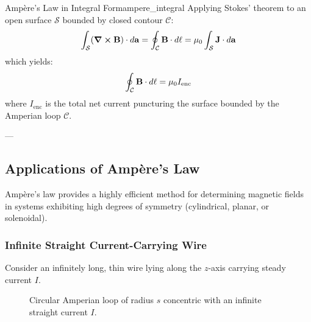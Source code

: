 \begin{proposition}{Ampère's Law in Integral Form}{ampere_integral}
Applying Stokes' theorem to an open surface $\mathcal{S}$ bounded by closed contour $\mathcal{C}$:
\begin{equation}
    \int_{\mathcal{S}} (\curl\vb{B}) \cdot d\vb{a} = \oint_{\mathcal{C}} \vb{B} \cdot d\vb{\ell} = \mu_0 \int_{\mathcal{S}} \vb{J} \cdot d\vb{a}
\end{equation}
which yields:
\begin{equation}
    \oint_{\mathcal{C}} \vb{B} \cdot d\vb{\ell} = \mu_0 I_{\mathrm{enc}}
\end{equation}
where $I_{\mathrm{enc}}$ is the total net current puncturing the surface bounded by the Amperian loop $\mathcal{C}$.
\end{proposition}

---

\subsection{Applications of Ampère's Law}
\label{sec:ampere_applications}

Ampère's law provides a highly efficient method for determining magnetic fields in systems exhibiting high degrees of symmetry (cylindrical, planar, or solenoidal).

\subsubsection{Infinite Straight Current-Carrying Wire}

Consider an infinitely long, thin wire lying along the $z$-axis carrying steady current $I$.

\begin{figure}[htbp]
    \centering
    \caption{Circular Amperian loop of radius $s$ concentric with an infinite straight current $I$.}
    \label{fig:straight_wire_ampere}
\end{figure}

